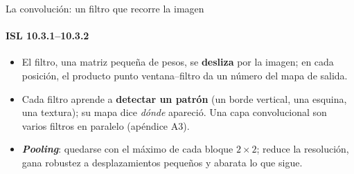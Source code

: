 \documentclass{beamer}
\newcommand{\1}{\mathbb{I}}
\begin{document}
\begin{frame}{La convolución: un filtro que recorre la imagen}
\framesubtitle{ISL 10.3.1--10.3.2}
\small
\begin{center}
\end{center}
\pause
\begin{itemize}\itemsep3pt
  \item El filtro, una matriz pequeña de pesos, se \textbf{desliza} por la imagen; en cada posición, el producto punto ventana--filtro da un número del mapa de salida.
  \item Cada filtro aprende a \textbf{detectar un patrón} (un borde vertical, una esquina, una textura); su mapa dice \emph{dónde} apareció. Una capa convolucional son varios filtros en paralelo (apéndice A3).
  \item \textbf{\emph{Pooling}}: quedarse con el máximo de cada bloque $2\times2$; reduce la resolución, gana robustez a desplazamientos pequeños y abarata lo que sigue.
\end{itemize}
\end{frame}
\end{document}
